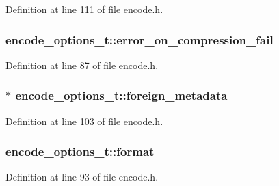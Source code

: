 Definition at line 111 of file encode.\+h.

\subsubsection[{\texorpdfstring{error\+\_\+on\+\_\+compression\+\_\+fail}{error_on_compression_fail}}]{ encode\+\_\+options\+\_\+t\+::error\+\_\+on\+\_\+compression\+\_\+fail}\hypertarget{structencode__options__t_ac8b6c6286cd995d50440df8685f33634}{}\label{structencode__options__t_ac8b6c6286cd995d50440df8685f33634}


Definition at line 87 of file encode.\+h.

\subsubsection[{\texorpdfstring{foreign\+\_\+metadata}{foreign_metadata}}]{$\ast$ encode\+\_\+options\+\_\+t\+::foreign\+\_\+metadata}\hypertarget{structencode__options__t_aca77fa9c1e317d6c105c3ad7701de837}{}\label{structencode__options__t_aca77fa9c1e317d6c105c3ad7701de837}


Definition at line 103 of file encode.\+h.

\subsubsection[{\texorpdfstring{format}{format}}]{ encode\+\_\+options\+\_\+t\+::format}\hypertarget{structencode__options__t_a67a1085293b8014c232e7728d5f695f3}{}\label{structencode__options__t_a67a1085293b8014c232e7728d5f695f3}


Definition at line 93 of file encode.\+h.

